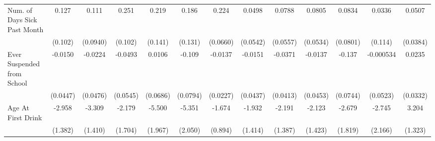 {\begin{tabular}{l*{12}{c}}
\addlinespace
Num. of Days Sick Past Month&       0.127         &       0.111         &       0.251\sym{*}  &       0.219         &       0.186         &       0.224\sym{***}&      0.0498         &      0.0788         &      0.0805         &      0.0834         &      0.0336         &      0.0507         \\
            &     (0.102)         &    (0.0940)         &     (0.102)         &     (0.141)         &     (0.131)         &    (0.0660)         &    (0.0542)         &    (0.0557)         &    (0.0534)         &    (0.0801)         &     (0.114)         &    (0.0384)         \\
\addlinespace
Ever Suspended from School&     -0.0150         &     -0.0224         &     -0.0493         &      0.0106         &      -0.109         &     -0.0137         &     -0.0151         &     -0.0371         &     -0.0137         &      -0.137         &   -0.000534         &      0.0235         \\
            &    (0.0447)         &    (0.0476)         &    (0.0545)         &    (0.0686)         &    (0.0794)         &    (0.0227)         &    (0.0437)         &    (0.0413)         &    (0.0453)         &    (0.0744)         &    (0.0523)         &    (0.0332)         \\
\addlinespace
Age At First Drink&      -2.958\sym{*}  &      -3.309\sym{*}  &      -2.179         &      -5.500\sym{**} &      -5.351\sym{**} &      -1.674         &      -1.932         &      -2.191         &      -2.123         &      -2.679         &      -2.745         &       3.204\sym{*}  \\
            &     (1.382)         &     (1.410)         &     (1.704)         &     (1.967)         &     (2.050)         &     (0.894)         &     (1.414)         &     (1.387)         &     (1.423)         &     (1.819)         &     (2.166)         &     (1.323)         \\
\bottomrule
\end{tabular}
}
